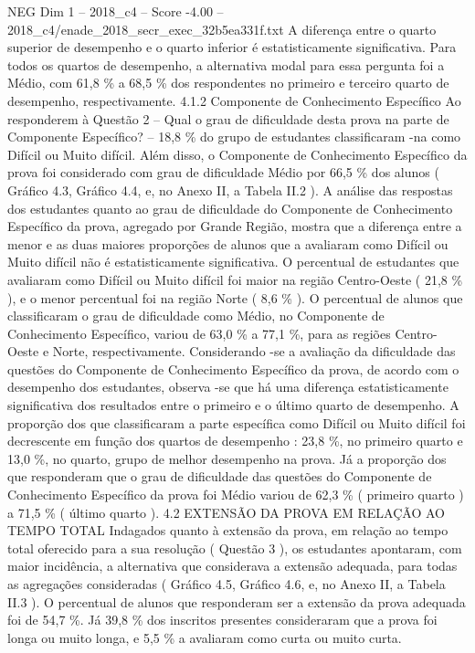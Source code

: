 \begin{textsample}{NEG Dim 1 – 2018\_c4 – Score -4.00 – 2018\_c4/enade\_2018\_secr\_exec\_32b5ea331f.txt}
A diferença entre o quarto superior de desempenho e o quarto inferior é estatisticamente significativa.
Para todos os quartos de desempenho, a alternativa modal para essa pergunta foi a Médio, com 61,8 \% a 68,5 \% dos respondentes no primeiro e terceiro quarto de desempenho, respectivamente. 4.1.2 Componente de Conhecimento Específico Ao responderem à Questão 2 – Qual o grau de dificuldade desta prova na parte de Componente Específico? – 18,8 \% do grupo de estudantes classificaram -na como Difícil ou Muito difícil.
Além disso, o Componente de Conhecimento Específico da prova foi considerado com grau de dificuldade Médio por 66,5 \% dos alunos ( Gráfico 4.3, Gráfico 4.4, e, no Anexo II, a Tabela II.2 ).
A análise das respostas dos estudantes quanto ao grau de dificuldade do Componente de Conhecimento Específico da prova, agregado por Grande Região, mostra que a diferença entre a menor e as duas maiores proporções de alunos que a avaliaram como Difícil ou Muito difícil não é estatisticamente significativa.
O percentual de estudantes que avaliaram como Difícil ou Muito difícil foi maior na região Centro-Oeste ( 21,8 \% ), e o menor percentual foi na região Norte ( 8,6 \% ).
O percentual de alunos que classificaram o grau de dificuldade como Médio, no Componente de Conhecimento Específico, variou de 63,0 \% a 77,1 \%, para as regiões Centro-Oeste e Norte, respectivamente.
Considerando -se a avaliação da dificuldade das questões do Componente de Conhecimento Específico da prova, de acordo com o desempenho dos estudantes, observa -se que há uma diferença estatisticamente significativa dos resultados entre o primeiro e o último quarto de desempenho.
A proporção dos que classificaram a parte específica como Difícil ou Muito difícil foi decrescente em função dos quartos de desempenho : 23,8 \%, no primeiro quarto e 13,0 \%, no quarto, grupo de melhor desempenho na prova.
Já a proporção dos que responderam que o grau de dificuldade das questões do Componente de Conhecimento Específico da prova foi Médio variou de 62,3 \% ( primeiro quarto ) a 71,5 \% ( último quarto ). 4.2 EXTENSÃO DA PROVA EM RELAÇÃO AO TEMPO TOTAL Indagados quanto à extensão da prova, em relação ao tempo total oferecido para a sua resolução ( Questão 3 ), os estudantes apontaram, com maior incidência, a alternativa que considerava a extensão adequada, para todas as agregações consideradas ( Gráfico 4.5, Gráfico 4.6, e, no Anexo II, a Tabela II.3 ).
O percentual de alunos que responderam ser a extensão da prova adequada foi de 54,7 \%.
Já 39,8 \% dos inscritos presentes consideraram que a prova foi longa ou muito longa, e 5,5 \% a avaliaram como curta ou muito curta.

\end{textsample}
